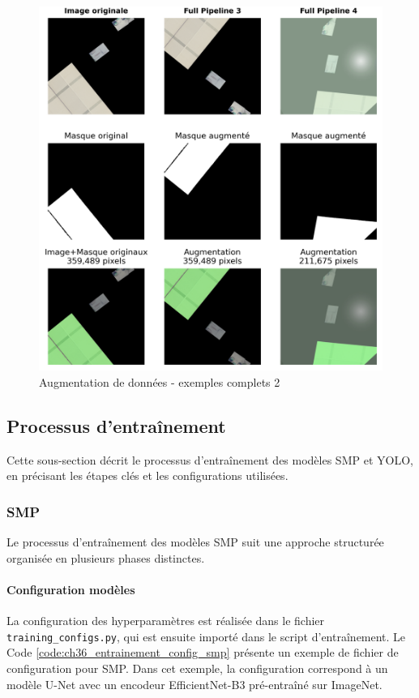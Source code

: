 \begin{figure}[H]
    \centering
    \includegraphics[width=1\linewidth]{02-main/figures/ch3/ch36_augmentations_15_exemples_complets2.png}
    \caption{Augmentation de données - exemples complets 2}
    \label{fig:ch36_augmentations_15_exemples_complets2}
\end{figure}


\subsection{Processus d'entraînement}
Cette sous-section décrit le processus d'entraînement des modèles SMP et YOLO, en précisant les étapes clés et les configurations utilisées.

\subsubsection{SMP}
Le processus d'entraînement des modèles SMP suit une approche structurée organisée en plusieurs phases distinctes.

\paragraph{Configuration modèles}
La configuration des hyperparamètres est réalisée dans le fichier \texttt{training\_configs.py}, qui est ensuite importé dans le script d'entraînement. Le Code \ref{code:ch36_entrainement_config_smp} présente un exemple de fichier de configuration pour SMP. Dans cet exemple, la configuration correspond à un modèle U-Net avec un encodeur EfficientNet-B3 pré-entraîné sur ImageNet.

